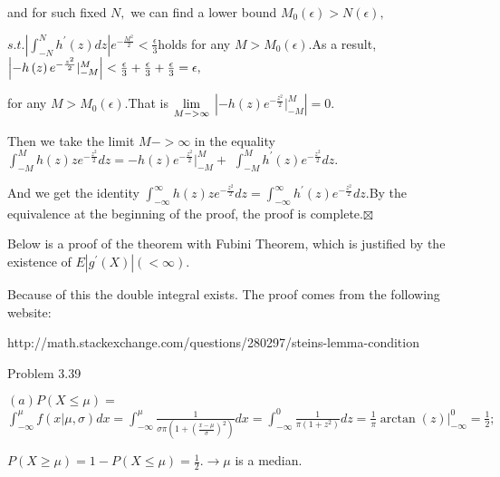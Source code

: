 \documentclass{article}
\begin{document}
and for such fixed $N,$ we can find a lower bound $M_{0}\left( \epsilon
\right) >N\left( \epsilon \right) ,$

$s.t.\left\vert \int_{-N}^{N}h^{\prime }\left( z\right) dz\right\vert e^{-%
\frac{M^{2}}{2}}<\frac{\epsilon }{3}$holds for any $M>M_{0}\left( \epsilon
\right) .$As a result, $\left\vert -h\left( z\right) e^{-\frac{z^{2}}{2}%
}|_{-M}^{M}\right\vert <\frac{\epsilon }{3}+\frac{\epsilon }{3}+\frac{%
\epsilon }{3}=\epsilon ,$

for any $M>M_{0}\left( \epsilon \right) .$That is $\underset{M->\infty }{%
\lim }$ $\left\vert -h\left( z\right) e^{-\frac{z^{2}}{2}}|_{-M}^{M}\right%
\vert =0.$

Then we take the limit  $M->\infty $ in the equality $\int_{-M}^{M}h\left(
z\right) ze^{-\frac{z^{2}}{2}}dz=-h\left( z\right) e^{-\frac{z^{2}}{2}%
}|_{-M}^{M}+$ $\int_{-M}^{M}h^{\prime }\left( z\right) e^{-\frac{z^{2}}{2}%
}dz.$

And we get the identity  $\int_{-\infty }^{\infty }h\left( z\right) ze^{-%
\frac{z^{2}}{2}}dz=\int_{-\infty }^{\infty }h^{\prime }\left( z\right) e^{-%
\frac{z^{2}}{2}}dz.$By the equivalence at the beginning of the proof, the
proof is complete.$\boxtimes $

Below is a proof of the theorem with Fubini Theorem, which is justified by
the existence of $E\left\vert g^{\prime }\left( X\right) \right\vert \left(
<\infty \right) .$

Because of this the double integral exists. The proof comes from the
following website:

http://math.stackexchange.com/questions/280297/steins-lemma-condition\qquad
\qquad \qquad\ \ \ \ 




Problem 3.39

$\left( a\right) P\left( X\leq \mu \right) =$ $\int_{-\infty }^{\mu }f\left(
x|\mu ,\sigma \right) dx=\int_{-\infty }^{\mu }\frac{1}{\sigma \pi \left(
1+\left( \frac{x-\mu }{\sigma }\right) ^{2}\right) }dx=\int_{-\infty }^{0}%
\frac{1}{\pi \left( 1+z^{2}\right) }dz=\frac{1}{\pi }\arctan \left( z\right)
|_{-\infty }^{0}=\frac{1}{2};$

$P\left( X\geq \mu \right) =1-P\left( X\leq \mu \right) =\frac{1}{2}%
.\rightarrow \mu $ is a median.
\end{document}
